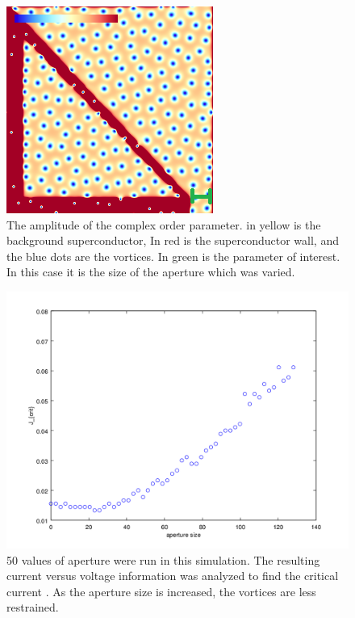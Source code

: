 \begin{figure}[htbp]
\begin{center}
\includegraphics[scale=.50]{oneSidedDone.png}
\caption{ The amplitude of the complex order parameter. in yellow is the background superconductor, In red is the superconductor wall, and the blue dots are the vortices. In green is the parameter of interest. In this case it is the size of the aperture which was varied. }
\label{oneSidedX}
\end{center}
\end{figure}


\begin{figure}[htbp]
\begin{center}
\includegraphics[scale=.50]{oneSidedAperture.png}
\caption{ 50 values of aperture were run in this simulation. The resulting current versus voltage information was analyzed to find the critical current . As the aperture size is increased, the vortices are less restrained. }
\label{normalYscan}
\end{center}
\end{figure}

